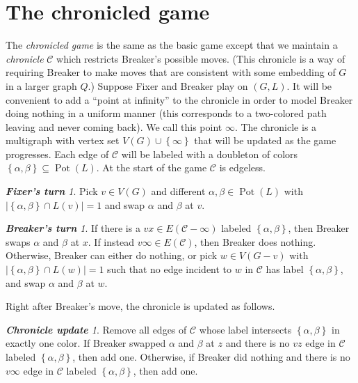 \documentclass[12pt,reqno]{amsart}
\theoremstyle{plain}
\theoremstyle{definition}
\theoremstyle{remark}
\newtheorem*{FixerMove}{\bf {Fixer's turn}}
\newtheorem*{BreakerMove}{\bf {Breaker's turn}}
\newtheorem*{ChronicleUpdate}{\bf {Chronicle update}}
\newcommand{\fancy}[1]{\mathcal{#1}}
\newcommand{\C}[1]{\fancy{C}_{#1}}
\newcommand{\set}[1]{\left\{ #1 \right\}}
\newcommand{\card}[1]{\left|#1\right|}
\newcommand{\pot}{\operatorname{Pot}}
\renewcommand{\C}{\fancy{C}}
\begin{document}
\section{The chronicled game}
The \emph{chronicled game} is the same as the basic game except that we
maintain a \emph{chronicle} $\C$ which restricts Breaker's possible moves. 
(This chronicle is a way of requiring Breaker to make moves that are consistent
with some embedding of $G$ in a larger graph $Q$.)
Suppose Fixer and Breaker play on $(G, L)$.  It will be convenient to add a ``point at infinity'' to the chronicle in order to model Breaker doing nothing in a uniform manner (this corresponds to a two-colored path leaving and never coming back).  We call this point $\infty$.
The chronicle is a multigraph with vertex set $V(G) \cup \set{\infty}$ that will be updated as the game progresses.  Each edge of
$\C$ will be labeled with a doubleton of colors $\set{\alpha, \beta} \subseteq \pot(L)$.  At the start of the game $\C$ is edgeless.  

\begin{FixerMove}
Pick $v \in V(G)$ and different $\alpha, \beta \in \pot(L)$ with $\card{\set{\alpha, \beta} \cap L(v)} = 1$ and swap $\alpha$ and $\beta$ at $v$.
\end{FixerMove}

\begin{BreakerMove}
If there is a $vx \in E(\C - \infty)$ labeled $\set{\alpha, \beta}$, then Breaker swaps $\alpha$ and $\beta$ at $x$.
If instead $v\infty \in E(\C)$, then Breaker does nothing.
Otherwise, Breaker can either do nothing, or pick $w \in V(G - v)$ with $\card{\set{\alpha, \beta} \cap L(w)} = 1$ such that no edge incident to $w$ in $\C$ has label $\set{\alpha, \beta}$, and swap $\alpha$ and $\beta$ at $w$.
\end{BreakerMove}

\noindent Right after Breaker's move, the chronicle is updated as follows.

\begin{ChronicleUpdate}
Remove all edges of $\C$ whose label intersects $\set{\alpha, \beta}$ in exactly one color.  
If Breaker swapped $\alpha$ and $\beta$ at $z$ and there is no $vz$ edge in $\C$ labeled $\set{\alpha, \beta}$, then add one.
Otherwise, if Breaker did nothing and there is no $v\infty$ edge in $\C$ labeled $\set{\alpha, \beta}$, then add one.
\end{ChronicleUpdate}
\end{document}
